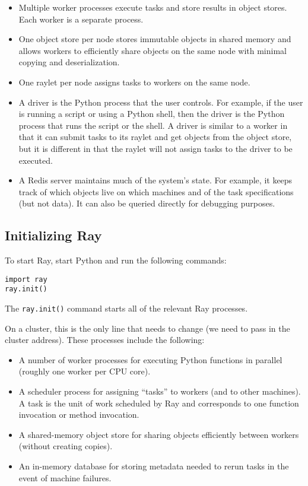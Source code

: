 \begin{itemize}
    \item Multiple worker processes execute tasks and store results in object stores. Each worker is a separate process.
    \item One object store per node stores immutable objects in shared memory and allows workers to efficiently share objects on the same node with minimal copying and deserialization.
    \item One raylet per node assigns tasks to workers on the same node.
    \item A driver is the Python process that the user controls. For example, if the user is running a script or using a Python shell, then the driver is the Python process that runs the script or the shell. A driver is similar to a worker in that it can submit tasks to its raylet and get objects from the object store, but it is different in that the raylet will not assign tasks to the driver to be executed.
    \item A Redis server maintains much of the system’s state. For example, it keeps track of which objects live on which machines and of the task specifications (but not data). It can also be queried directly for debugging purposes.
\end{itemize}

\subsection{Initializing Ray}
To start Ray, start Python and run the following commands:
\begin{verbatim}
import ray
ray.init()
\end{verbatim}

The \verb|ray.init()| command starts all of the relevant Ray processes. 

On a cluster, this is the only line that needs to change (we need to pass in the cluster address). These processes include the following:
\begin{itemize}
    \item A number of worker processes for executing Python functions in parallel (roughly one worker per CPU core).
    \item A scheduler process for assigning “tasks” to workers (and to other machines). A task is the unit of work scheduled by Ray and corresponds to one function invocation or method invocation.
    \item A shared-memory object store for sharing objects efficiently between workers (without creating copies).
    \item An in-memory database for storing metadata needed to rerun tasks in the event of machine failures.
\end{itemize}

